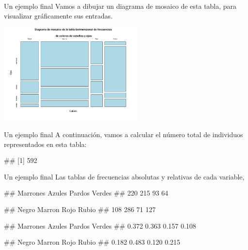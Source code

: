 \documentclass[
  ignorenonframetext,
  aspectratio=169]{beamer}
\let\oldverbatim\verbatim
\let\endoldverbatim\endverbatim
\renewenvironment{verbatim}{\tiny\oldverbatim}{\endoldverbatim}
\begin{document}
\begin{frame}{Un ejemplo final}
\protect\hypertarget{un-ejemplo-final-2}{}
Vamos a dibujar un diagrama de mosaico de esta tabla, para visualizar
gráficamente sus entradas.

\begin{center}\includegraphics[width=275px]{Hora3_files/figure-beamer/unnamed-chunk-48-1} \end{center}
\end{frame}

\begin{frame}[fragile]{Un ejemplo final}
\protect\hypertarget{un-ejemplo-final-3}{}
A continuación, vamos a calcular el número total de individuos
representados en esta tabla:

\begin{verbatim}
## [1] 592
\end{verbatim}
\end{frame}

\begin{frame}[fragile]{Un ejemplo final}
\protect\hypertarget{un-ejemplo-final-4}{}
Las tablas de frecuencias absolutas y relativas de cada variable,

\begin{verbatim}
## Marrones   Azules   Pardos   Verdes 
##      220      215       93       64
\end{verbatim}

\begin{verbatim}
##  Negro Marron   Rojo  Rubio 
##    108    286     71    127
\end{verbatim}

\begin{verbatim}
## Marrones   Azules   Pardos   Verdes 
##    0.372    0.363    0.157    0.108
\end{verbatim}

\begin{verbatim}
##  Negro Marron   Rojo  Rubio 
##  0.182  0.483  0.120  0.215
\end{verbatim}
\end{frame}
\end{document}
